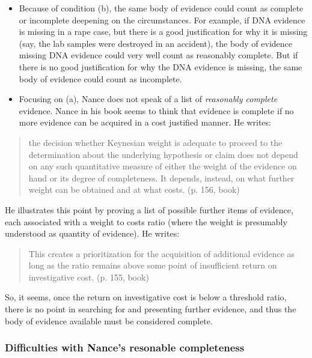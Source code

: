 \documentclass[
  10pt,
  dvipsnames,enabledeprecatedfontcommands]{scrartcl}
\begin{document}
\begin{itemize}
\item
  Because of condition (b), the same body of evidence could count as
  complete or incomplete deepening on the circumstances. For example, if
  DNA evidence is missing in a rape case, but there is a good
  justification for why it is missing (say, the lab samples were
  destroyed in an accident), the body of evidence missing DNA evidence
  could very well count as reasonably complete. But if there is no good
  justification for why the DNA evidence is missing, the same body of
  evidence could count as incomplete.
\item
  Focusing on (a), Nance does not speak of a list of \emph{reasonably
  complete} evidence. Nance in his book seems to think that evidence is
  complete if no more evidence can be acquired in a cost justified
  manner. He writes:
\end{itemize}

\begin{quote}
the decision whether Keynesian weight is adequate to proceed to the determination about the underlying hypothesis or claim does not depend on any such quantitative measure of either the weight of the evidence on hand or its degree of completeness. It depends, instead, on what further weight can be obtained and at what costs. (p. 156, book)
\end{quote}

He illustrates this point by proving a list of possible further items of
evidence, each associated with a weight to costs ratio (where the weight
is presumably understood as quantity of evidence). He writes:

\begin{quote}
This creates a prioritization for the acquisition of additional evidence as long as the ratio remains above some point of insufficient return on investigative cost. (p. 155, book)
\end{quote}

So, it seems, once the return on investigative cost is below a threshold
ratio, there is no point in searching for and presenting further
evidence, and thus the body of evidence available must be considered
complete.

\hypertarget{difficulties-with-nances-resonable-completeness}{%
\subsubsection{Difficulties with Nance's resonable
completeness}\label{difficulties-with-nances-resonable-completeness}}
\end{document}
